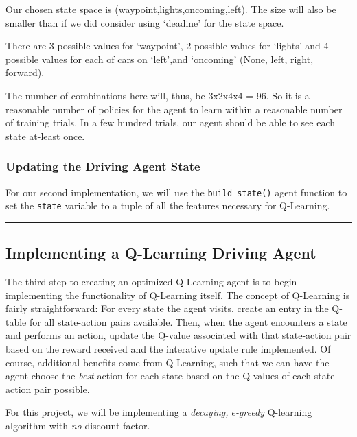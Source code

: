 \documentclass[11pt]{article}
\begin{document}
    Our chosen state space is (waypoint,lights,oncoming,left). The size will
also be smaller than if we did consider using `deadine' for the state
space.

There are 3 possible values for `waypoint', 2 possible values for
`lights' and 4 possible values for each of cars on `left',and `oncoming'
(None, left, right, forward).

The number of combinations here will, thus, be 3x2x4x4 = 96. So it is a
reasonable number of policies for the agent to learn within a reasonable
number of training trials. In a few hundred trials, our agent should be
able to see each state at-least once.

    \hypertarget{updating-the-driving-agent-state}{%
\subsubsection{Updating the Driving Agent
State}\label{updating-the-driving-agent-state}}

For our second implementation, we will use the
\texttt{\textquotesingle{}build\_state()\textquotesingle{}} agent
function to set the \texttt{\textquotesingle{}state\textquotesingle{}}
variable to a tuple of all the features necessary for Q-Learning.

    \begin{center}\rule{0.5\linewidth}{\linethickness}\end{center}

\hypertarget{implementing-a-q-learning-driving-agent}{%
\subsection{Implementing a Q-Learning Driving
Agent}\label{implementing-a-q-learning-driving-agent}}

The third step to creating an optimized Q-Learning agent is to begin
implementing the functionality of Q-Learning itself. The concept of
Q-Learning is fairly straightforward: For every state the agent visits,
create an entry in the Q-table for all state-action pairs available.
Then, when the agent encounters a state and performs an action, update
the Q-value associated with that state-action pair based on the reward
received and the interative update rule implemented. Of course,
additional benefits come from Q-Learning, such that we can have the
agent choose the \emph{best} action for each state based on the Q-values
of each state-action pair possible.

For this project, we will be implementing a \emph{decaying,}
\(\epsilon\)\emph{-greedy} Q-learning algorithm with \emph{no} discount
factor.
\end{document}
